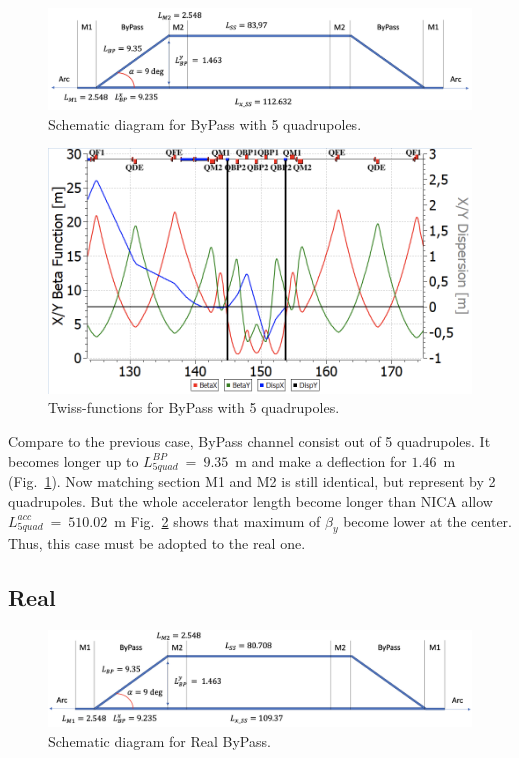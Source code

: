 \documentclass[a4paper,
               keeplastbox,   %
               ]{jacow}
\begin{document}
\begin{figure}[!htb]
   \centering
   \includegraphics*[width=1.\columnwidth]{img/MOPA072_f4-1}
   \caption{Schematic diagram for ByPass with 5 quadrupoles.}
   \label{fig:5quad}
\end{figure}

\begin{figure}
   \centering
   \includegraphics*[width=1.\columnwidth]{img/MOPA072_f5-1}
   \caption{Twiss-functions for ByPass with 5 quadrupoles.}
   \label{fig:5quadTwiss}
\end{figure}

\par Compare to the previous case, ByPass channel consist out of 5 quadrupoles. It becomes longer up to $L^{BP}_{5quad}~=~9.35$~m and make a deflection for $1.46$~m (Fig.~\ref{fig:5quad}). Now matching section M1 and M2 is still identical, but represent by 2 quadrupoles. But the whole accelerator length become longer than NICA allow $L^{acc}_{5quad}~=~510.02$~m Fig.~\ref{fig:5quadTwiss} shows that maximum of $\beta_{y}$ become lower at the center. Thus, this case must be adopted to the real one.

\subsection{Real}

\begin{figure}[!htb]
   \centering
   \includegraphics*[width=1.\columnwidth]{img/MOPA072_f6-1}
   \caption{Schematic diagram for Real ByPass.}
   \label{fig:real}
\end{figure}
\end{document}
